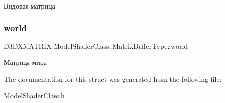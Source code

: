 Видовая матрица 

\mbox{\label{struct_model_shader_class_1_1_matrix_buffer_type_aed066876b9ef3711cd691e89001011e7}} 
\subsubsection{\texorpdfstring{world}{world}}
{\footnotesize\ttfamily D3\+D\+X\+M\+A\+T\+R\+IX Model\+Shader\+Class\+::\+Matrix\+Buffer\+Type\+::world}



Матрица мира 



The documentation for this struct was generated from the following file\+:\begin{DoxyCompactItemize}
\item 
\hyperlink{_model_shader_class_8h}{Model\+Shader\+Class.\+h}\end{DoxyCompactItemize}
